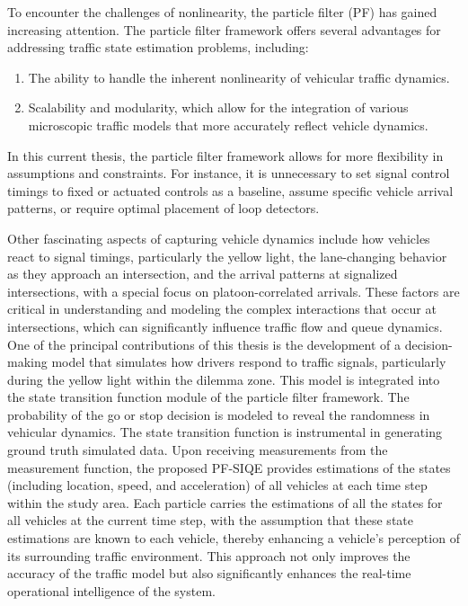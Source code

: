 To encounter the challenges of nonlinearity, the particle filter (PF) has gained increasing attention. The particle filter framework offers several advantages for addressing traffic state estimation problems, including:
\begin{enumerate}
    \item The ability to handle the inherent nonlinearity of vehicular traffic dynamics.
    \item Scalability and modularity, which allow for the integration of various microscopic traffic models that more accurately reflect vehicle dynamics.
\end{enumerate}

In this current thesis, the particle filter framework allows for more flexibility in assumptions and constraints. For instance, it is unnecessary to set signal control timings to fixed or actuated controls as a baseline, assume specific vehicle arrival patterns, or require optimal placement of loop detectors. 

Other fascinating aspects of capturing vehicle dynamics include how vehicles react to signal timings, particularly the yellow light, the lane-changing behavior as they approach an intersection, and the arrival patterns at signalized intersections, with a special focus on platoon-correlated arrivals. These factors are critical in understanding and modeling the complex interactions that occur at intersections, which can significantly influence traffic flow and queue dynamics. One of the principal contributions of this thesis is the development of a decision-making model that simulates how drivers respond to traffic signals, particularly during the yellow light within the dilemma zone. This model is integrated into the state transition function module of the particle filter framework. The probability of the go or stop decision is modeled to reveal the randomness in vehicular dynamics. The state transition function is instrumental in generating ground truth simulated data. Upon receiving measurements from the measurement function, the proposed PF-SIQE provides estimations of the states (including location, speed, and acceleration) of all vehicles at each time step within the study area. Each particle carries the estimations of all the states for all vehicles at the current time step, with the assumption that these state estimations are known to each vehicle, thereby enhancing a vehicle's perception of its surrounding traffic environment. This approach not only improves the accuracy of the traffic model but also significantly enhances the real-time operational intelligence of the system.

